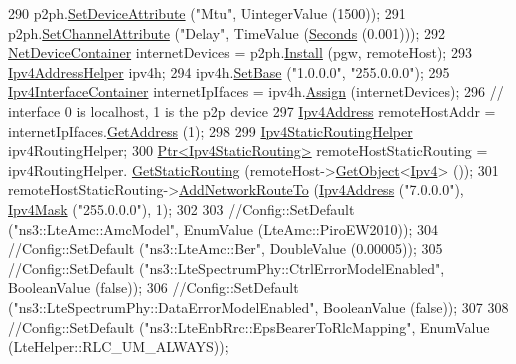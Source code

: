 \begin{DoxyCode}
290   p2ph.\hyperlink{classns3_1_1PointToPointHelper_a4577f5ab8c387e5528af2e0fbab1152e}{SetDeviceAttribute} (\textcolor{stringliteral}{"Mtu"}, UintegerValue (1500));
291   p2ph.\hyperlink{classns3_1_1PointToPointHelper_a6b5317fd17fb61e5a53f8d66a90b63b9}{SetChannelAttribute} (\textcolor{stringliteral}{"Delay"}, TimeValue (\hyperlink{group__timecivil_ga33c34b816f8ff6628e33d5c8e9713b9e}{Seconds} (0.001)));
292   \hyperlink{classns3_1_1NetDeviceContainer}{NetDeviceContainer} internetDevices = p2ph.\hyperlink{classns3_1_1PointToPointHelper_ab9162fea3e88722666fed1106df1f9ec}{Install} (pgw, remoteHost);
293   \hyperlink{classns3_1_1Ipv4AddressHelper}{Ipv4AddressHelper} ipv4h;
294   ipv4h.\hyperlink{classns3_1_1Ipv4AddressHelper_acf7b16dd25bac67e00f5e25f90a9a035}{SetBase} (\textcolor{stringliteral}{"1.0.0.0"}, \textcolor{stringliteral}{"255.0.0.0"});
295   \hyperlink{classns3_1_1Ipv4InterfaceContainer}{Ipv4InterfaceContainer} internetIpIfaces = ipv4h.\hyperlink{classns3_1_1Ipv4AddressHelper_af8e7f4a1a7e74c00014a1eac445a27af}{Assign} (internetDevices);
296   \textcolor{comment}{// interface 0 is localhost, 1 is the p2p device}
297   \hyperlink{classns3_1_1Ipv4Address}{Ipv4Address} remoteHostAddr = internetIpIfaces.\hyperlink{classns3_1_1Ipv4InterfaceContainer_ae63208dcd222be986822937ee4aa828c}{GetAddress} (1);
298 
299   \hyperlink{classns3_1_1Ipv4StaticRoutingHelper}{Ipv4StaticRoutingHelper} ipv4RoutingHelper;
300   \hyperlink{classns3_1_1Ptr}{Ptr<Ipv4StaticRouting>} remoteHostStaticRouting = ipv4RoutingHelper.
      \hyperlink{classns3_1_1Ipv4StaticRoutingHelper_a731206e50d305695dac7fb2ef963a4bb}{GetStaticRouting} (remoteHost->\hyperlink{classns3_1_1Object_a13e18c00017096c8381eb651d5bd0783}{GetObject}<\hyperlink{classns3_1_1Ipv4}{Ipv4}> ());
301   remoteHostStaticRouting->\hyperlink{classns3_1_1Ipv4StaticRouting_a8bf5eaa7ba49fe33c78c70d5560b6c39}{AddNetworkRouteTo} (\hyperlink{classns3_1_1Ipv4Address}{Ipv4Address} (\textcolor{stringliteral}{"7.0.0.0"}), 
      \hyperlink{classns3_1_1Ipv4Mask}{Ipv4Mask} (\textcolor{stringliteral}{"255.0.0.0"}), 1);
302 
303   \textcolor{comment}{//Config::SetDefault ("ns3::LteAmc::AmcModel", EnumValue (LteAmc::PiroEW2010));}
304   \textcolor{comment}{//Config::SetDefault ("ns3::LteAmc::Ber", DoubleValue (0.00005));}
305   \textcolor{comment}{//Config::SetDefault ("ns3::LteSpectrumPhy::CtrlErrorModelEnabled", BooleanValue (false));}
306   \textcolor{comment}{//Config::SetDefault ("ns3::LteSpectrumPhy::DataErrorModelEnabled", BooleanValue (false));}
307 
308   \textcolor{comment}{//Config::SetDefault ("ns3::LteEnbRrc::EpsBearerToRlcMapping", EnumValue (LteHelper::RLC\_UM\_ALWAYS));}

\end{DoxyCode}
